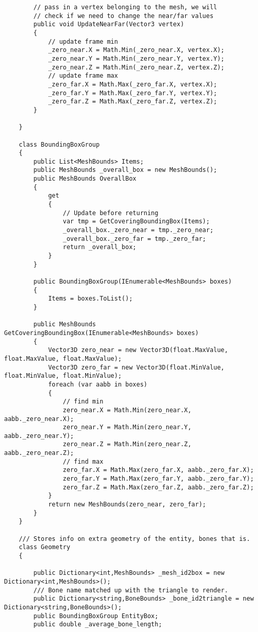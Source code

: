\begin{scriptsize}
\begin{verbatim}
        // pass in a vertex belonging to the mesh, we will 
        // check if we need to change the near/far values
        public void UpdateNearFar(Vector3 vertex)
        {
            // update frame min
            _zero_near.X = Math.Min(_zero_near.X, vertex.X);
            _zero_near.Y = Math.Min(_zero_near.Y, vertex.Y);
            _zero_near.Z = Math.Min(_zero_near.Z, vertex.Z);
            // update frame max
            _zero_far.X = Math.Max(_zero_far.X, vertex.X);
            _zero_far.Y = Math.Max(_zero_far.Y, vertex.Y);
            _zero_far.Z = Math.Max(_zero_far.Z, vertex.Z);
        }

    }

    class BoundingBoxGroup
    {
        public List<MeshBounds> Items;
        public MeshBounds _overall_box = new MeshBounds();
        public MeshBounds OverallBox
        {
            get
            {
                // Update before returning
                var tmp = GetCoveringBoundingBox(Items);
                _overall_box._zero_near = tmp._zero_near;
                _overall_box._zero_far = tmp._zero_far;
                return _overall_box;
            }
        }

        public BoundingBoxGroup(IEnumerable<MeshBounds> boxes)
        {
            Items = boxes.ToList();
        }

        public MeshBounds GetCoveringBoundingBox(IEnumerable<MeshBounds> boxes)
        {
            Vector3D zero_near = new Vector3D(float.MaxValue, float.MaxValue, float.MaxValue);
            Vector3D zero_far = new Vector3D(float.MinValue, float.MinValue, float.MinValue);
            foreach (var aabb in boxes)
            {
                // find min
                zero_near.X = Math.Min(zero_near.X, aabb._zero_near.X);
                zero_near.Y = Math.Min(zero_near.Y, aabb._zero_near.Y);
                zero_near.Z = Math.Min(zero_near.Z, aabb._zero_near.Z);
                // find max
                zero_far.X = Math.Max(zero_far.X, aabb._zero_far.X);
                zero_far.Y = Math.Max(zero_far.Y, aabb._zero_far.Y);
                zero_far.Z = Math.Max(zero_far.Z, aabb._zero_far.Z);
            }
            return new MeshBounds(zero_near, zero_far);
        }
    }

    /// Stores info on extra geometry of the entity, bones that is.
    class Geometry
    {

        public Dictionary<int,MeshBounds> _mesh_id2box = new Dictionary<int,MeshBounds>();
        /// Bone name matched up with the triangle to render.
        public Dictionary<string,BoneBounds> _bone_id2triangle = new Dictionary<string,BoneBounds>();
        public BoundingBoxGroup EntityBox;
        public double _average_bone_length;


\end{verbatim}
\end{scriptsize}
